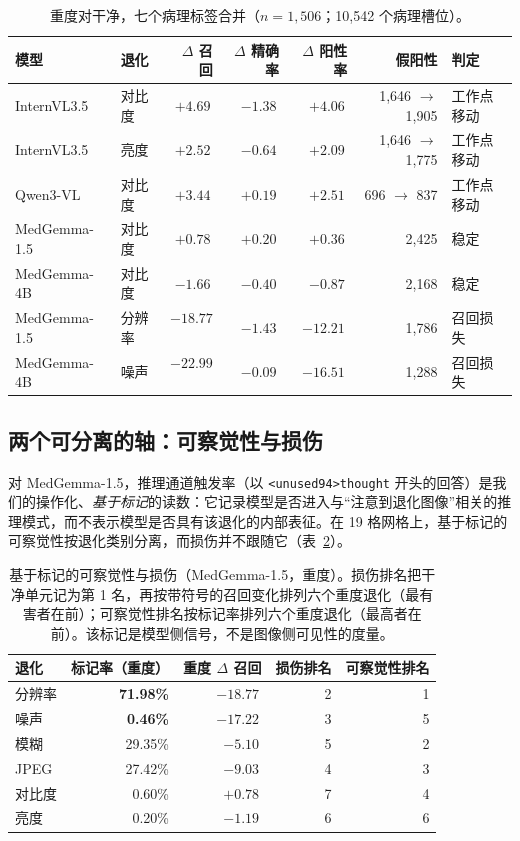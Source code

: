 \begin{table}[t]
\centering
\small
\caption{重度对干净，七个病理标签合并（$n=1{,}506$；10,542 个病理槽位）。}
\label{tab:op}
\begin{tabular}{llrrrrl}
\toprule
模型 & 退化 & $\Delta$ 召回 & $\Delta$ 精确率 & $\Delta$ 阳性率 & 假阳性 & 判定 \\
\midrule
InternVL3.5 & 对比度 & $\mathbf{+4.69}$\,\pp{} & $-1.38$\,\pp{} & $\mathbf{+4.06}$\,\pp{} & 1,646 $\rightarrow$ 1,905 & 工作点移动 \\
InternVL3.5 & 亮度 & $+2.52$\,\pp{} & $-0.64$\,\pp{} & $+2.09$\,\pp{} & 1,646 $\rightarrow$ 1,775 & 工作点移动 \\
Qwen3-VL & 对比度 & $+3.44$\,\pp{} & $+0.19$\,\pp{} & $+2.51$\,\pp{} & 696 $\rightarrow$ 837 & 工作点移动 \\
MedGemma-1.5 & 对比度 & $+0.78$\,\pp{} & $+0.20$\,\pp{} & $+0.36$\,\pp{} & 2,425 & 稳定 \\
MedGemma-4B & 对比度 & $-1.66$\,\pp{} & $-0.40$\,\pp{} & $-0.87$\,\pp{} & 2,168 & 稳定 \\
MedGemma-1.5 & 分辨率 & $\mathbf{-18.77}$\,\pp{} & $-1.43$\,\pp{} & $-12.21$\,\pp{} & 1,786 & 召回损失 \\
MedGemma-4B & 噪声 & $\mathbf{-22.99}$\,\pp{} & $-0.09$\,\pp{} & $-16.51$\,\pp{} & 1,288 & 召回损失 \\
\bottomrule
\end{tabular}
\end{table}

\subsection{两个可分离的轴：可察觉性与损伤}
\label{sec:results-twoaxis}

对 MedGemma-1.5，推理通道触发率（以 \texttt{<unused94>thought} 开头的回答）是我们的操作化、\emph{基于标记}的读数：它记录模型是否进入与``注意到退化图像''相关的推理模式，而不表示模型是否具有该退化的内部表征。在 19 格网格上，基于标记的可察觉性按退化类别分离，而损伤并不跟随它（表~\ref{tab:twoaxis}）。

\begin{table}[t]
\centering
\small
\caption{基于标记的可察觉性与损伤（MedGemma-1.5，重度）。损伤排名把干净单元记为第 1 名，再按带符号的召回变化排列六个重度退化（最有害者在前）；可察觉性排名按标记率排列六个重度退化（最高者在前）。该标记是模型侧信号，不是图像侧可见性的度量。}
\label{tab:twoaxis}
\begin{tabular}{lrrrr}
\toprule
退化 & 标记率（重度） & 重度 $\Delta$ 召回 & 损伤排名 & 可察觉性排名 \\
\midrule
分辨率 & \textbf{71.98\%} & $-18.77$\,\pp{} & 2 & 1 \\
噪声 & \textbf{0.46\%} & $-17.22$\,\pp{} & 3 & 5 \\
模糊 & 29.35\% & $-5.10$\,\pp{} & 5 & 2 \\
JPEG & 27.42\% & $-9.03$\,\pp{} & 4 & 3 \\
对比度 & 0.60\% & $+0.78$\,\pp{} & 7 & 4 \\
亮度 & 0.20\% & $-1.19$\,\pp{} & 6 & 6 \\
\bottomrule
\end{tabular}
\end{table}

